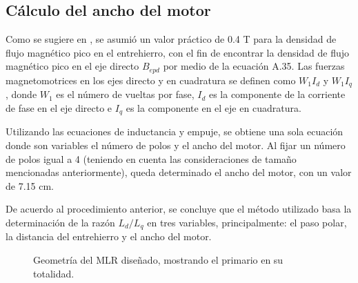 \subsection{Cálculo del ancho del motor}
Como se sugiere en \cite{boldea2013}, se asumió un valor práctico de 0.4 T para la densidad de flujo magnético pico en el entrehierro, con el fin de encontrar la densidad de flujo magnético pico en el eje directo $B_{epd}$ por medio de la ecuación A.35. 
Las fuerzas magnetomotrices en los ejes directo y en cuadratura se definen como $W_1 I_d$ y $W_1 I_q$, donde $W_1$ es el número de vueltas por fase, $I_d$ es la componente de la corriente de fase en el eje directo e $I_q$ es la componente en el eje en cuadratura.

Utilizando las ecuaciones de inductancia y empuje, se obtiene una sola ecuación donde son variables el número de polos y el ancho del motor. Al fijar un número de polos igual a 4 (teniendo en cuenta las consideraciones de tamaño mencionadas anteriormente), queda determinado el ancho del motor, con un valor de 7.15 cm.

De acuerdo al procedimiento anterior, se concluye que el método utilizado basa la determinación de la razón $L_d/L_q$ en tres variables, principalmente: el paso polar, la distancia del entrehierro y el ancho del motor.

\begin{figure}[!]
\centering
{}
\caption{Geometría del MLR diseñado, mostrando el primario en su totalidad.}
\label{fig:domains}
\end{figure}



